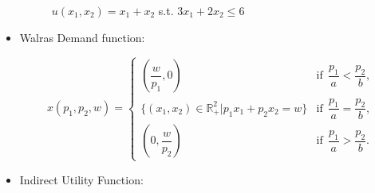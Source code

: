 \documentclass[
12pt, %
a4paper, %
onecolumn, %
portrait %
]{article}
\begin{document}
\begin{itemize}
\begin{figure}[H]
	\centering
	\caption{$u(x_1,x_2)=x_1+x_2$ s.t. $3x_1+2x_2\le 6$}
	\label{Fig.lable}
\end{figure}



\item Walras Demand function:

\begin{equation*}
x(p_1,p_2,w)=\begin{cases}
\left(\dfrac{w}{p_1},0\right)&\text{if}\;\,\dfrac{p_1}{a}<\dfrac{p_2}{b},\\
\{(x_1,x_2)\in\mathbb{R}^2_+|p_1x_1+p_2x_2=w\}&\text{if}\;\, \dfrac{p_1}{a}=\dfrac{p_2}{b},\\
\left(0,\dfrac{w}{p_2}\right)&\text{if}\;\,\dfrac{p_1}{a}>\dfrac{p_2}{b}.
\end{cases}
\end{equation*}
   

\item Indirect Utility Function:


\end{itemize}
\end{document}
